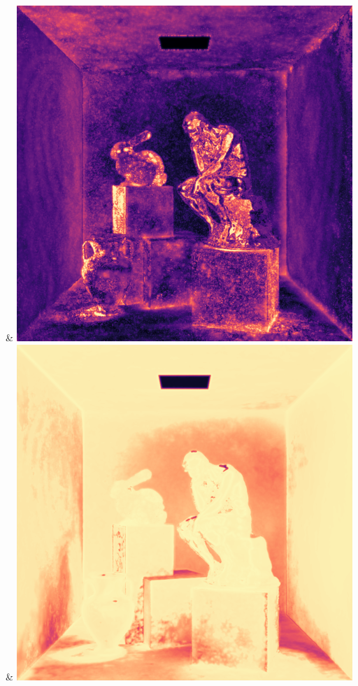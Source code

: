 & \includegraphics[width=\linewidth]{figures/py/tests/quality_comparison/nrc+bt_1spp_thinker_flip.png}
& \includegraphics[width=\linewidth]{figures/py/tests/quality_comparison/nrc+lt_1spp_thinker_flip.png}
